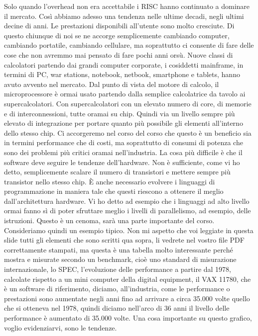 Solo quando l'overhead non era accettabile i RISC hanno continuato a dominare il mercato.
Così abbiamo adesso una tendenza nelle ultime decadi, negli ultimi decine di anni.
Le prestazioni disponibili all'utente sono molto cresciute.
Di questo chiunque di noi se ne accorge semplicemente cambiando computer, cambiando portatile, cambiando cellulare, ma soprattutto ci consente di fare delle cose che non avremmo mai pensato di fare pochi anni orsù.
Nuove classi di calcolatori partendo dai grandi computer corporate, i cosiddetti mainframe, in termini di PC, war stations, notebook, netbook, smartphone e tablets, hanno avuto avvento nel mercato.
Dal punto di vista del motore di calcolo, il microprocessore è ormai usato partendo dalla semplice calcolatrice da tavolo ai supercalcolatori.
Con supercalcolatori con un elevato numero di core, di memorie e di interconnessioni, tutte oramai su chip.
Quindi via un livello sempre più elevato di integrazione per portare quanto più possibile gli elementi all'interno dello stesso chip.
Ci accorgeremo nel corso del corso che questo è un beneficio sia in termini performance che di costi, ma soprattutto di consumi di potenza che sono dei problemi più critici oramai nell'industria.
La cosa più difficile è che il software deve seguire le tendenze dell'hardware.
Non è sufficiente, come vi ho detto, semplicemente scalare il numero di transistori e mettere sempre più transistor nello stesso chip.
È anche necessario evolvere i linguaggi di programmazione in maniera tale che questi riescono a ottenere il meglio dall'architettura hardware.
Vi ho detto ad esempio che i linguaggi ad alto livello ormai fanno sì di poter sfruttare meglio i livelli di parallelismo, ad esempio, delle istruzioni.
Questo è un cenoma, sarà una parte importante del corso.
Consideriamo quindi un esempio tipico.
Non mi aspetto che voi leggiate in questa slide tutti gli elementi che sono scritti qua sopra, li vedrete nel vostro file PDF correttamente stampati, ma questa è una tabella molto interessante perché mostra e misurate secondo un benchmark, cioè uno standard di misurazione internazionale, lo SPEC, l'evoluzione delle performance a partire dal 1978, calcolate rispetto a un mini computer della digital equipment, il VAX 11780, che è un software di riferimento, diciamo, all'industria, come le performance o prestazioni sono aumentate negli anni fino ad arrivare a circa 35.000 volte quello che si otteneva nel 1978, quindi diciamo nell'arco di 36 anni il livello delle performance è aumentato di 35.000 volte.
Una cosa importante su questo grafico, voglio evidenziarvi, sono le tendenze.
